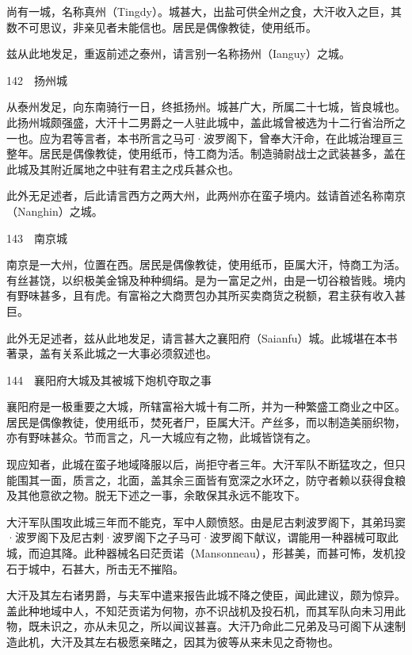 \documentclass[12pt,UTF8]{ctexbook}
\begin{document}
尚有一城，名称真州（Tingdy）。城甚大，出盐可供全州之食，大汗收入之巨，其数不可思议，非亲见者未能信也。居民是偶像教徒，使用纸币。

兹从此地发足，重返前述之泰州，请言别一名称扬州（Ianguy）之城。





142　扬州城

从泰州发足，向东南骑行一日，终抵扬州。城甚广大，所属二十七城，皆良城也。此扬州城颇强盛，大汗十二男爵之一人驻此城中，盖此城曾被选为十二行省治所之一也。应为君等言者，本书所言之马可·波罗阁下，曾奉大汗命，在此城治理亘三整年。居民是偶像教徒，使用纸币，恃工商为活。制造骑尉战士之武装甚多，盖在此城及其附近属地之中驻有君主之戍兵甚众也。

此外无足述者，后此请言西方之两大州，此两州亦在蛮子境内。兹请首述名称南京（Nanghin）之城。





143　南京城

南京是一大州，位置在西。居民是偶像教徒，使用纸币，臣属大汗，恃商工为活。有丝甚饶，以织极美金锦及种种绸绢。是为一富足之州，由是一切谷粮皆贱。境内有野味甚多，且有虎。有富裕之大商贾包办其所买卖商货之税额，君主获有收入甚巨。

此外无足述者，兹从此地发足，请言甚大之襄阳府（Saianfu）城。此城堪在本书著录，盖有关系此城之一大事必须叙述也。





144　襄阳府大城及其被城下炮机夺取之事

襄阳府是一极重要之大城，所辖富裕大城十有二所，并为一种繁盛工商业之中区。居民是偶像教徒，使用纸币，焚死者尸，臣属大汗。产丝多，而以制造美丽织物，亦有野味甚众。节而言之，凡一大城应有之物，此城皆饶有之。

现应知者，此城在蛮子地域降服以后，尚拒守者三年。大汗军队不断猛攻之，但只能围其一面，质言之，北面，盖其余三面皆有宽深之水环之，防守者赖以获得食粮及其他意欲之物。脱无下述之一事，余敢保其永远不能攻下。

大汗军队围攻此城三年而不能克，军中人颇愤怒。由是尼古剌波罗阁下，其弟玛窦·波罗阁下及尼古剌·波罗阁下之子马可·波罗阁下献议，谓能用一种器械可取此城，而迫其降。此种器械名曰茫贡诺（Mansonneau），形甚美，而甚可怖，发机投石于城中，石甚大，所击无不摧陷。

大汗及其左右诸男爵，与夫军中遣来报告此城不降之使臣，闻此建议，颇为惊异。盖此种地域中人，不知茫贡诺为何物，亦不识战机及投石机，而其军队向未习用此物，既未识之，亦从未见之，所以闻议甚喜。大汗乃命此二兄弟及马可阁下从速制造此机，大汗及其左右极愿亲睹之，因其为彼等从来未见之奇物也。
\end{document}
